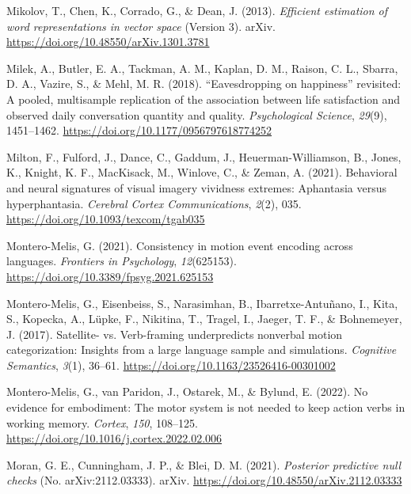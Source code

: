 \documentclass[
  12pt,
  man,floatsintext]{apa7}
\newlength{\cslhangindent}
\newlength{\cslentryspacingunit} %
\newenvironment{CSLReferences}[2] %
 {%
  \setlength{\parindent}{0pt}
  \ifodd #1
  \let\oldpar\par
  \def\par{\hangindent=\cslhangindent\oldpar}
  \fi
  \setlength{\parskip}{#2\cslentryspacingunit}
 }%
 {}
\begin{document}
\begin{CSLReferences}{1}{0}
\leavevmode{}%
Mikolov, T., Chen, K., Corrado, G., \& Dean, J. (2013). \emph{Efficient estimation of word representations in vector space} (Version 3). {arXiv}. \url{https://doi.org/10.48550/arXiv.1301.3781}

\leavevmode{}%
Milek, A., Butler, E. A., Tackman, A. M., Kaplan, D. M., Raison, C. L., Sbarra, D. A., Vazire, S., \& Mehl, M. R. (2018). {``{Eavesdropping} on happiness''} revisited: {A} pooled, multisample replication of the association between life satisfaction and observed daily conversation quantity and quality. \emph{Psychological Science}, \emph{29}(9), 1451--1462. \url{https://doi.org/10.1177/0956797618774252}

\leavevmode{}%
Milton, F., Fulford, J., Dance, C., Gaddum, J., Heuerman-Williamson, B., Jones, K., Knight, K. F., MacKisack, M., Winlove, C., \& Zeman, A. (2021). Behavioral and neural signatures of visual imagery vividness extremes: Aphantasia versus hyperphantasia. \emph{Cerebral Cortex Communications}, \emph{2}(2), 035. \url{https://doi.org/10.1093/texcom/tgab035}

\leavevmode{}%
Montero-Melis, G. (2021). Consistency in motion event encoding across languages. \emph{Frontiers in Psychology}, \emph{12}(625153). \url{https://doi.org/10.3389/fpsyg.2021.625153}

\leavevmode{}%
Montero-Melis, G., Eisenbeiss, S., Narasimhan, B., Ibarretxe-Antuñano, I., Kita, S., Kopecka, A., Lüpke, F., Nikitina, T., Tragel, I., Jaeger, T. F., \& Bohnemeyer, J. (2017). Satellite- vs. Verb-framing underpredicts nonverbal motion categorization: Insights from a large language sample and simulations. \emph{Cognitive Semantics}, \emph{3}(1), 36--61. \url{https://doi.org/10.1163/23526416-00301002}

\leavevmode{}%
Montero-Melis, G., van Paridon, J., Ostarek, M., \& Bylund, E. (2022). No evidence for embodiment: {The} motor system is not needed to keep action verbs in working memory. \emph{Cortex}, \emph{150}, 108--125. \url{https://doi.org/10.1016/j.cortex.2022.02.006}

\leavevmode{}%
Moran, G. E., Cunningham, J. P., \& Blei, D. M. (2021). \emph{Posterior predictive null checks} (No. arXiv:2112.03333). {arXiv}. \url{https://doi.org/10.48550/arXiv.2112.03333}


\end{CSLReferences}
\end{document}
